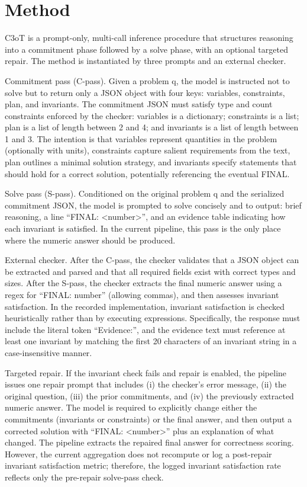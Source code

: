 \documentclass[journal,article,submit,pdftex,moreauthors]{Definitions/mdpi}
\begin{document}
\section{Method}

C3oT is a prompt-only, multi-call inference procedure that structures reasoning into a commitment phase followed by a solve phase, with an optional targeted repair. The method is instantiated by three prompts and an external checker.

Commitment pass (C-pass). Given a problem q, the model is instructed not to solve but to return only a JSON object with four keys: variables, constraints, plan, and invariants. The commitment JSON must satisfy type and count constraints enforced by the checker: variables is a dictionary; constraints is a list; plan is a list of length between 2 and 4; and invariants is a list of length between 1 and 3. The intention is that variables represent quantities in the problem (optionally with units), constraints capture salient requirements from the text, plan outlines a minimal solution strategy, and invariants specify statements that should hold for a correct solution, potentially referencing the eventual FINAL.

Solve pass (S-pass). Conditioned on the original problem q and the serialized commitment JSON, the model is prompted to solve concisely and to output: brief reasoning, a line “FINAL: <number>”, and an evidence table indicating how each invariant is satisfied. In the current pipeline, this pass is the only place where the numeric answer should be produced.

External checker. After the C-pass, the checker validates that a JSON object can be extracted and parsed and that all required fields exist with correct types and sizes. After the S-pass, the checker extracts the final numeric answer using a regex for “FINAL: number” (allowing commas), and then assesses invariant satisfaction. In the recorded implementation, invariant satisfaction is checked heuristically rather than by executing expressions. Specifically, the response must include the literal token “Evidence:”, and the evidence text must reference at least one invariant by matching the first 20 characters of an invariant string in a case-insensitive manner.

Targeted repair. If the invariant check fails and repair is enabled, the pipeline issues one repair prompt that includes (i) the checker’s error message, (ii) the original question, (iii) the prior commitments, and (iv) the previously extracted numeric answer. The model is required to explicitly change either the commitments (invariants or constraints) or the final answer, and then output a corrected solution with “FINAL: <number>” plus an explanation of what changed. The pipeline extracts the repaired final answer for correctness scoring. However, the current aggregation does not recompute or log a post-repair invariant satisfaction metric; therefore, the logged invariant satisfaction rate reflects only the pre-repair solve-pass check.
\end{document}
